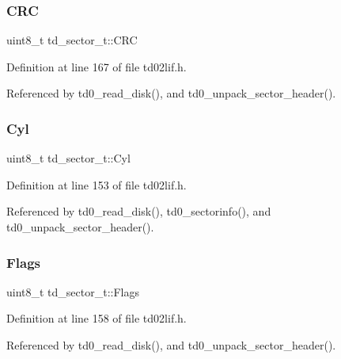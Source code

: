 \subsubsection{\texorpdfstring{C\+RC}{CRC}}
{\footnotesize\ttfamily uint8\+\_\+t td\+\_\+sector\+\_\+t\+::\+C\+RC}



Definition at line 167 of file td02lif.\+h.



Referenced by td0\+\_\+read\+\_\+disk(), and td0\+\_\+unpack\+\_\+sector\+\_\+header().

\mbox{\label{structtd__sector__t_afddd9f1e3a41cc6e3a9be2478cd3305b}} 
\subsubsection{\texorpdfstring{Cyl}{Cyl}}
{\footnotesize\ttfamily uint8\+\_\+t td\+\_\+sector\+\_\+t\+::\+Cyl}



Definition at line 153 of file td02lif.\+h.



Referenced by td0\+\_\+read\+\_\+disk(), td0\+\_\+sectorinfo(), and td0\+\_\+unpack\+\_\+sector\+\_\+header().

\mbox{\label{structtd__sector__t_ad30cfc0c6589ff25f8456ada5b352efa}} 
\subsubsection{\texorpdfstring{Flags}{Flags}}
{\footnotesize\ttfamily uint8\+\_\+t td\+\_\+sector\+\_\+t\+::\+Flags}



Definition at line 158 of file td02lif.\+h.



Referenced by td0\+\_\+read\+\_\+disk(), and td0\+\_\+unpack\+\_\+sector\+\_\+header().

\mbox{\label{structtd__sector__t_a703252220f745cd6adfedadd5cc993d6}} 

